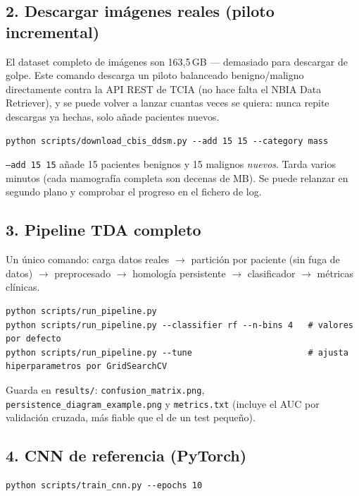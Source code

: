 \documentclass[11pt,a4paper]{article}
\begin{document}
\subsection{2. Descargar imágenes reales (piloto incremental)}

El dataset completo de imágenes son 163{,}5\,GB — demasiado para descargar de
golpe. Este comando descarga un piloto balanceado benigno/maligno
directamente contra la API REST de TCIA (no hace falta el NBIA Data
Retriever), y se puede volver a lanzar cuantas veces se quiera: nunca repite
descargas ya hechas, solo añade pacientes nuevos.

\begin{lstlisting}
python scripts/download_cbis_ddsm.py --add 15 15 --category mass
\end{lstlisting}

\texttt{--add 15 15} añade 15 pacientes benignos y 15 malignos \emph{nuevos}.
Tarda varios minutos (cada mamografía completa son decenas de MB). Se puede
relanzar en segundo plano y comprobar el progreso en el fichero de log.

\subsection{3. Pipeline TDA completo}

Un único comando: carga datos reales $\to$ partición por paciente (sin fuga
de datos) $\to$ preprocesado $\to$ homología persistente $\to$ clasificador
$\to$ métricas clínicas.

\begin{lstlisting}
python scripts/run_pipeline.py
python scripts/run_pipeline.py --classifier rf --n-bins 4   # valores por defecto
python scripts/run_pipeline.py --tune                       # ajusta hiperparametros por GridSearchCV
\end{lstlisting}

Guarda en \texttt{results/}: \texttt{confusion\_matrix.png},
\texttt{persistence\_diagram\_example.png} y \texttt{metrics.txt} (incluye el
AUC por validación cruzada, más fiable que el de un test pequeño).

\subsection{4. CNN de referencia (PyTorch)}

\begin{lstlisting}
python scripts/train_cnn.py --epochs 10
\end{lstlisting}
\end{document}
